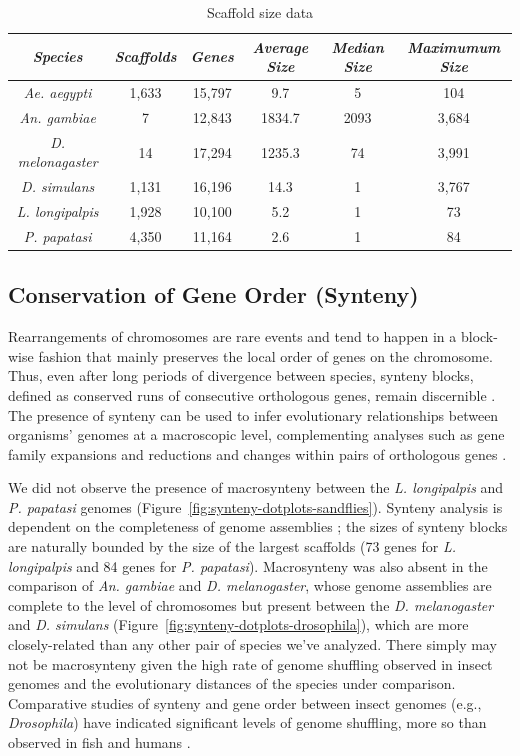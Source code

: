 \begin{table}[H]
  \centering
  \begin{tabular}{c c c c c c} \hline
    \emph{Species} & \emph{Scaffolds} & \emph{Genes} & \emph{Average Size} & \emph{Median Size} & \emph{Maximumum Size} \\ \hline
    \emph{Ae. aegypti} & 1,633 & 15,797 & 9.7 & 5 & 104 \\
    \emph{An. gambiae} & 7 & 12,843 & 1834.7 & 2093 & 3,684 \\
    \emph{D. melonagaster} & 14 & 17,294 & 1235.3 & 74 & 3,991 \\ 
    \emph{D. simulans} & 1,131 & 16,196 & 14.3 & 1 & 3,767 \\ 
    \emph{L. longipalpis} & 1,928 & 10,100 & 5.2 & 1 & 73\\
    \emph{P. papatasi} & 4,350 & 11,164 & 2.6 & 1 & 84
  \end{tabular}
  \caption{Scaffold size data}
  \label{tab:scaffold-sizes}
\end{table}

\subsection{Conservation of Gene Order (Synteny)}
Rearrangements of chromosomes are rare events and tend to happen in a block-wise fashion that mainly preserves the local order of genes on the chromosome. Thus, even after long periods of divergence between species, synteny blocks, defined as conserved runs of consecutive orthologous genes, remain discernible \cite{Heger2007}.  The presence of synteny can be used to infer evolutionary relationships between organisms' genomes at a macroscopic level, complementing analyses such as gene family expansions and reductions and changes within pairs of orthologous genes \cite{Zdobnov2002,Zdobnov2007}.

We did not observe the presence of macrosynteny between the \emph{L. longipalpis} and \emph{P. papatasi} genomes (Figure~\ref{fig:synteny-dotplots-sandflies}).  Synteny analysis is dependent on the completeness of genome assemblies \cite{Heger2007}; the sizes of synteny blocks are naturally bounded by the size of the largest scaffolds (73 genes for \emph{L. longipalpis} and 84 genes for \emph{P. papatasi}). Macrosynteny was also absent in the comparison of \emph{An. gambiae} and \emph{D. melanogaster}, whose genome assemblies are complete to the level of chromosomes but present between the \emph{D. melanogaster} and \emph{D. simulans} (Figure~\ref{fig:synteny-dotplots-drosophila}), which are more closely-related than any other pair of species we've analyzed. There simply may not be macrosynteny given the high rate of genome shuffling observed in insect genomes and the evolutionary distances of the species under comparison. Comparative studies of synteny and gene order between insect genomes (e.g., \emph{Drosophila}) have indicated significant levels of genome shuffling, more so than observed in fish and humans \cite{Ranz2001,Zdobnov2002,Zdobnov2007}.


